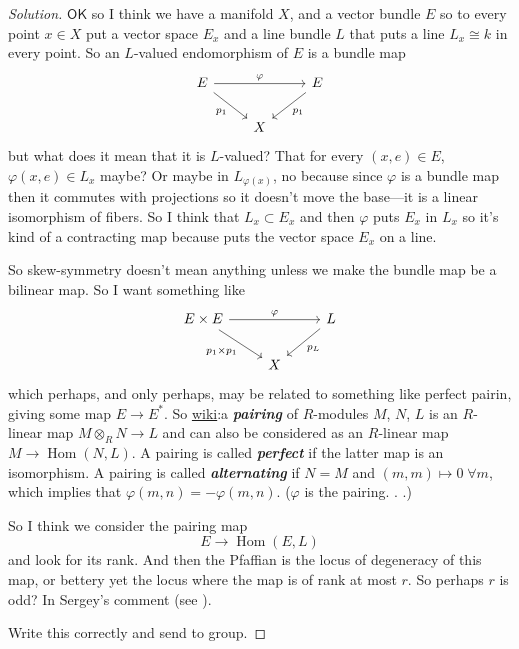 \begin{proof}[Solution]\leavevmode
	$\mathsf{OK}$ so I think we have a manifold $X$, and a vector bundle $E$ so to every point $x \in X$ put a vector space $E_x$ and a line bundle  $L$ that puts a line $L_x\cong k$ in every point. So an $L$-valued endomorphism of $E$ is a bundle map
	\[\begin{tikzcd}
	E\arrow[rr,"\varphi"]\arrow[dr,"p_1",swap]&&E\arrow[dl,"p_1"]\\
	&X
	\end{tikzcd}\]
	but what does it mean that it is $L$-valued? That  for every $(x,e)\in E$, $\varphi(x,e)\in L_x$ maybe? Or maybe in $L_{\varphi(x)}$, no because since $\varphi$ is a bundle map then it commutes with projections so it doesn't move the base---it is a linear isomorphism of fibers. So I think that $L_x\subset E_x$ and then $\varphi$ puts $E_x$ in  $L_x$ so it's kind of a contracting map because puts the vector space  $E_x$  on a line.

	So skew-symmetry doesn't mean anything unless we make the bundle map be a bilinear map. So I want something like
	\[\begin{tikzcd}
	E\times E\arrow[rr,"\varphi"]\arrow[dr,"p_1\times p_1",swap]&&L\arrow[dl,"p_L"]\\
	&X
	\end{tikzcd}\]
	which perhaps, and only perhaps, may be related to something like perfect pairin, giving some map $E\to  E^*$. So \href{https://en.wikipedia.org/wiki/Pairing#Definition}{wiki}:a  \textit{\textbf{pairing}} of  $R$-modules $M$,  $N$,  $L$ is an $R$-linear map $M\otimes_R N\to L$  and can also be considered as an $R$-linear map $M \to \operatorname{Hom}(N,L)$. A pairing is called \textit{\textbf{perfect}} if the latter map is an isomorphism. A pairing is called  \textit{\textbf{alternating}} if $N=M$ and  $(m,m)\mapsto 0\;\forall m$, which implies that $\varphi(m,n) =-\varphi(m,n)$. ($\varphi$ is the pairing. . .)

	So I think we consider the pairing map
	\[E\to \operatorname{Hom}(E,L)\]
	and look for its rank. And then the Pfaffian is the locus of degeneracy of this map, or bettery yet the locus where the map is of rank at most $r$. So {\color{8}perhaps $r$ is odd? In Sergey's comment (see  \cite{luk2}).}

		{\color{8}Write this correctly and send to group.}
\end{proof}

\vspace{1em}

